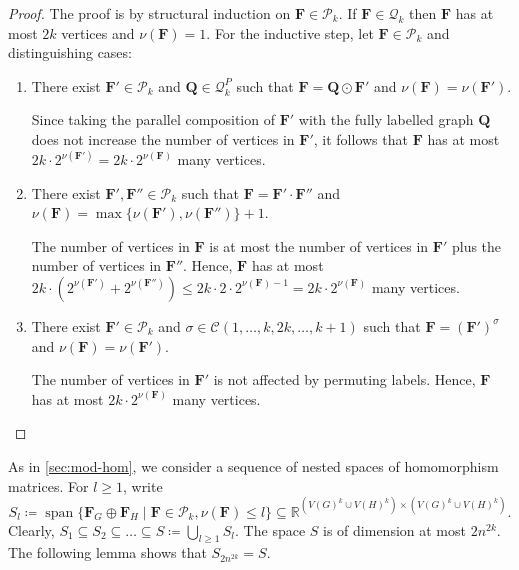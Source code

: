\documentclass[a4paper,onecolumn,11pt,accepted=2026-01-06]{quantumarticle}
\theoremstyle{plain}
\theoremstyle{remark}
\theoremstyle{definition}
\DeclareMathOperator{\spn}{span}
\newcommand{\cyclicpermutations}{\mathscr{C}(1,\dots, k, 2k, \dots, k+1)}
\begin{document}
\begin{proof}
	The proof is by structural induction on $\boldsymbol{F} \in \mathcal{P}_k$.
	If $\boldsymbol{F} \in \mathcal{Q}_k$ then $\boldsymbol{F}$ has at most $2k$ vertices and $\nu(\boldsymbol{F}) = 1$.
	For the inductive step, let $\boldsymbol{F} \in \mathcal{P}_k$ and distinguishing cases:
	\begin{enumerate}
		\item There exist $\boldsymbol{F}' \in \mathcal{P}_k$ and $\boldsymbol{Q} \in \mathcal{Q}_k^P$ such that $\boldsymbol{F} = \boldsymbol{Q} \odot \boldsymbol{F}'$ and $\nu(\boldsymbol{F}) = \nu(\boldsymbol{F}')$.
		
		Since taking the parallel composition of $\boldsymbol{F}'$ with the fully labelled graph $\boldsymbol{Q}$ does  not increase the number of vertices in $\boldsymbol{F}'$, it follows that $\boldsymbol{F}$ has at most $2k \cdot 2^{\nu(\boldsymbol{F}')} = 2k \cdot 2^{\nu(\boldsymbol{F})}$ many vertices.
		
		\item There exist $\boldsymbol{F}', \boldsymbol{F}'' \in \mathcal{P}_k$ such that $\boldsymbol{F} = \boldsymbol{F}' \cdot \boldsymbol{F}''$ and $\nu(\boldsymbol{F}) = \max\{ \nu(\boldsymbol{F}'), \nu(\boldsymbol{F}'')\} +1$.
		
		The number of vertices in $\boldsymbol{F}$ is at most the number of vertices in $\boldsymbol{F}'$ plus the number of vertices in $\boldsymbol{F}''$.
		Hence, $\boldsymbol{F}$ has at most $2k \cdot (2^{\nu(\boldsymbol{F}')} + 2^{\nu(\boldsymbol{F}'')}) \leq 2k \cdot 2 \cdot 2^{\nu(\boldsymbol{F}) - 1} = 2k \cdot 2^{\nu(\boldsymbol{F})}$ many vertices.
		
		\item There exist $\boldsymbol{F}' \in \mathcal{P}_k$ and $\sigma \in \cyclicpermutations$ such that $\boldsymbol{F} = (\boldsymbol{F}')^\sigma$ and $\nu(\boldsymbol{F}) = \nu(\boldsymbol{F}')$.
		
		The number of vertices in $\boldsymbol{F}'$ is not affected by permuting labels. Hence, $\boldsymbol{F}$ has at most $2k \cdot 2^{\nu(\boldsymbol{F})}$ many vertices. \qedhere
	\end{enumerate} 
\end{proof}

As in \cref{sec:mod-hom}, we consider a sequence of nested spaces of homomorphism matrices. For $l \geq 1$, write
\[
	S_l \coloneqq \spn \{ \boldsymbol{F}_G \oplus \boldsymbol{F}_H \mid \boldsymbol{F} \in \mathcal{P}_k, \nu(\boldsymbol{F}) \leq l \} 
	\subseteq \mathbb{R}^{(V(G)^k \cup V(H)^k) \times (V(G)^k \cup V(H)^k)}.
\]
Clearly, $S_1 \subseteq S_2 \subseteq \dots \subseteq S \coloneqq \bigcup_{l \geq 1} S_l$.
The space $S$ is of dimension at most $2n^{2k}$.
The following lemma shows that $S_{2n^{2k}} = S$.
\end{document}
